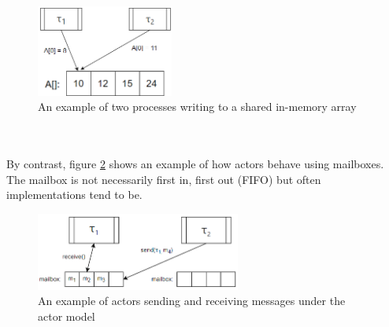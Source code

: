 \begin{figure}[h]
    \centering
    \includegraphics[width=0.4\textwidth]{images/shared_memory.png}
    \caption{An example of two processes writing to a shared in-memory array}
    \label{fig:shared_memory}
\end{figure}
\\ \\
By contrast, figure \ref{fig:actor_model} shows an example of how actors behave using mailboxes. The mailbox is not necessarily first in, first out (FIFO) but often implementations tend to be.
\begin{figure}[H]
    \centering
    \includegraphics[width=0.6\textwidth]{images/actor_model.png}
    \caption{An example of actors sending and receiving messages under the actor model}
    \label{fig:actor_model}
\end{figure}

